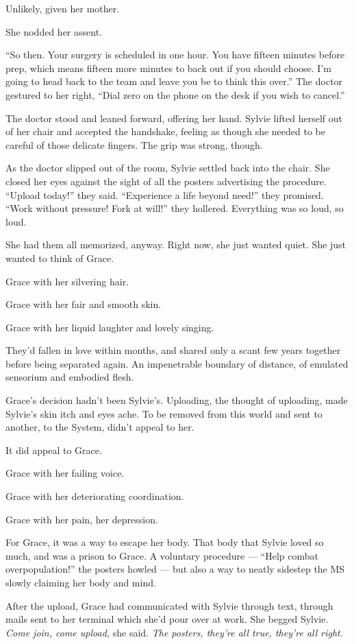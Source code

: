 Unlikely, given her mother.

She nodded her assent.

``So then. Your surgery is scheduled in one hour. You have fifteen minutes before prep, which means fifteen more minutes to back out if you should choose. I'm going to head back to the team and leave you be to think this over.'' The doctor gestured to her right, ``Dial zero on the phone on the desk if you wish to cancel.''

The doctor stood and leaned forward, offering her hand. Sylvie lifted herself out of her chair and accepted the handshake, feeling as though she needed to be careful of those delicate fingers. The grip was strong, though.

As the doctor slipped out of the room, Sylvie settled back into the chair. She closed her eyes against the sight of all the posters advertising the procedure. ``Upload today!'' they said. ``Experience a life beyond need!'' they promised. ``Work without pressure! Fork at will!'' they hollered. Everything was so loud, so loud.

She had them all memorized, anyway. Right now, she just wanted quiet. She just wanted to think of Grace.

Grace with her silvering hair.

Grace with her fair and smooth skin.

Grace with her liquid laughter and lovely singing.

They'd fallen in love within months, and shared only a scant few years together before being separated again. An impenetrable boundary of distance, of emulated sensorium and embodied flesh.

Grace's decision hadn't been Sylvie's. Uploading, the thought of uploading, made Sylvie's skin itch and eyes ache. To be removed from this world and sent to another, to the System, didn't appeal to her.

It did appeal to Grace.

Grace with her failing voice.

Grace with her deteriorating coordination.

Grace with her pain, her depression.

For Grace, it was a way to escape her body. That body that Sylvie loved so much, and was a prison to Grace. A voluntary procedure --- ``Help combat overpopulation!'' the posters howled --- but also a way to neatly sidestep the MS slowly claiming her body and mind.

After the upload, Grace had communicated with Sylvie through text, through mails sent to her terminal which she'd pour over at work. She begged Sylvie. \emph{Come join, come upload,} she said. \emph{The posters, they're all true, they're all right.}

